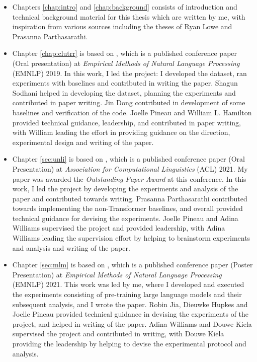 \documentclass[letterpaper, 12pt]{report}
\begin{document}
\begin{itemize}
  \item Chapters \autoref{chap:intro} and \autoref{chap:background} consists of introduction and technical background material for this thesis which are written by me, with inspiration from various sources including the theses of Ryan Lowe and Prasanna Parthasarathi.
  \item Chapter \autoref{chap:clutrr} is based on \cite{sinha-etal-2019-clutrr}, which is a published conference paper (Oral presentation) at \textit{Empirical Methods of Natural Language Processing} (EMNLP) 2019. In this work, I led the project: I developed the dataset, ran experiments with baselines and contributed in writing the paper. Shagun Sodhani helped in developing the dataset, planning the experiments and contributed in paper writing. Jin Dong contributed in development of some baselines and verification of the code. Joelle Pineau and William L. Hamilton provided technical guidance, leadership, and contributed in paper writing, with William leading the effort in providing guidance on the direction, experimental design and writing of the paper.
  \item Chapter \autoref{sec:unli} is based on \cite{sinha-etal-2021-unnatural}, which is a published conference paper (Oral Presentation) at \textit{Association for Computational Linguistics} (ACL) 2021. My paper was awarded the \textit{Outstanding Paper Award} at this conference. In this work, I led the project by developing the experiments and analysis of the paper and contributed towards writing. Prasanna Parthasarathi contributed towards implementing the non-Transformer baselines, and overall provided technical guidance for devising the experiments. Joelle Pineau and Adina Williams supervised the project and provided leadership, with Adina Williams leading the supervision effort by helping to brainstorm experiments and analysis and writing of the paper.
  \item Chapter \autoref{sec:mlm} is based on \cite{sinha-etal-2021-masked}, which is a published conference paper (Poster Presentation) at \textit{Empirical Methods of Natural Language Processing} (EMNLP) 2021. This work was led by me, where I developed and executed the experiments consisting of pre-training large language models and their subsequent analysis, and I wrote the paper. Robin Jia, Dieuwke Hupkes and Joelle Pineau provided technical guidance in devising the experiments of the project, and helped in writing of the paper. Adina Williams and Douwe Kiela supervised the project and contributed in writing, with Douwe Kiela providing the leadership by helping to devise the experimental protocol and analysis.

\end{itemize}
\end{document}

